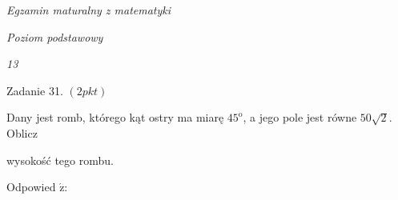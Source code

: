 \documentclass[a4paper,12pt]{article}
\begin{document}
{\it Egzamin maturalny z matematyki}

{\it Poziom podstawowy}

{\it 13}

Zadanie 31. $(2pkt)$

Dany jest romb, którego kąt ostry ma miarę $45^{\mathrm{o}}$, a jego pole jest równe $50\sqrt{2}$. Oblicz

wysokość tego rombu.

Odpowied $\acute{\mathrm{z}}$:
\end{document}
